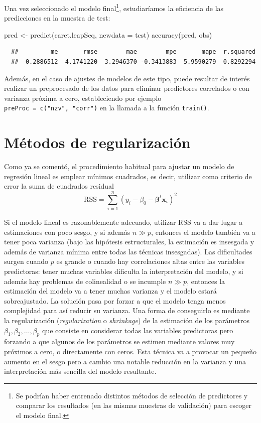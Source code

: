 \documentclass[
]{book}
\newenvironment{Shaded}{\begin{snugshade}}{\end{snugshade}}
\newcommand{\AttributeTok}[1]{\textcolor[rgb]{0.77,0.63,0.00}{#1}}
\newcommand{\FunctionTok}[1]{\textcolor[rgb]{0.00,0.00,0.00}{#1}}
\newcommand{\NormalTok}[1]{#1}
\newcommand{\OtherTok}[1]{\textcolor[rgb]{0.56,0.35,0.01}{#1}}
\theoremstyle{break}
\theoremstyle{nonumberplain}
\begin{document}
Una vez seleccionado el modelo final\footnote{Se podrían haber entrenado distintos métodos de selección de predictores y comparar los resultados (en las mismas muestras de validación) para escoger el modelo final.}, estudiaríamos la eficiencia de las predicciones en la muestra de test:

\begin{Shaded}
\begin{Highlighting}[]
\NormalTok{pred }\OtherTok{\textless{}{-}} \FunctionTok{predict}\NormalTok{(caret.leapSeq, }\AttributeTok{newdata =}\NormalTok{ test)}
\FunctionTok{accuracy}\NormalTok{(pred, obs)}
\end{Highlighting}
\end{Shaded}

\begin{verbatim}
  ##         me       rmse        mae        mpe       mape  r.squared 
  ##  0.2886512  4.1741220  3.2946370 -0.3413883  5.9590279  0.8292294
\end{verbatim}

Además, en el caso de ajustes de modelos de este tipo, puede resultar de interés realizar un preprocesado de los datos para eliminar predictores correlados o con varianza próxima a cero,
estableciendo por ejemplo \texttt{preProc\ =\ c("nzv",\ "corr")} en la llamada a la función \texttt{train()}.

\hypertarget{shrinkage}{%
\section{Métodos de regularización}\label{shrinkage}}

Como ya se comentó, el procedimiento habitual para ajustar un modelo de regresión lineal es emplear mínimos cuadrados, es decir, utilizar como criterio de error la suma de cuadrados residual
\[\mbox{RSS} = \sum\limits_{i=1}^{n}\left(  y_{i} - \beta_0 - \boldsymbol{\beta}^t \mathbf{x}_{i} \right)^{2}\]

Si el modelo lineal es razonablemente adecuado, utilizar \(\mbox{RSS}\) va a dar lugar a estimaciones con poco sesgo, y si además \(n\gg p\), entonces el modelo también va a tener poca varianza (bajo las hipótesis estructurales, la estimación es insesgada y además de varianza mínima entre todas las técnicas insesgadas).
Las dificultades surgen cuando \(p\) es grande o cuando hay correlaciones altas entre las variables predictoras: tener muchas variables dificulta la interpretación del modelo, y si además hay problemas de colinealidad o se incumple \(n\gg p\), entonces la estimación del modelo va a tener muchas varianza y el modelo estará sobreajustado.
La solución pasa por forzar a que el modelo tenga menos complejidad para así reducir su varianza.
Una forma de conseguirlo es mediante la regularización (\emph{regularization} o \emph{shrinkage}) de la estimación de los parámetros \(\beta_1, \beta_2,\ldots, \beta_p\) que consiste en considerar todas las variables predictoras pero forzando a que algunos de los parámetros se estimen mediante valores muy próximos a cero, o directamente con ceros.
Esta técnica va a provocar un pequeño aumento en el sesgo pero a cambio una notable reducción en la varianza y una interpretación más sencilla del modelo resultante.
\end{document}
